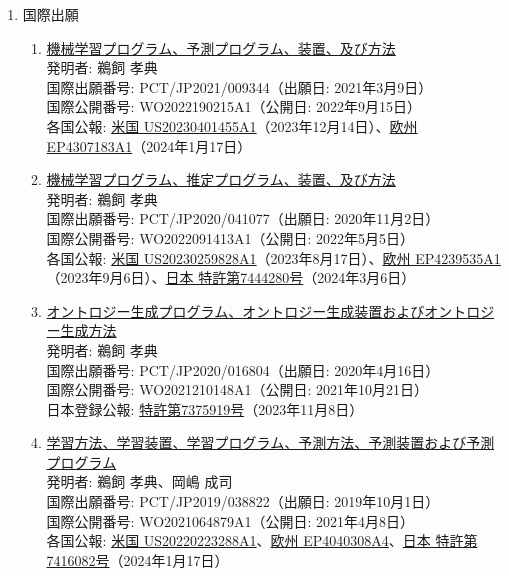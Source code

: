 \documentclass[dvipdfmx]{jlreq}
\begin{document}
\begin{enumerate}[label=\arabic*,align=parleft]
\item 国際出願
\begin{enumerate}
\item \href{https://patents.google.com/patent/WO2022190215A1/ja}{機械学習プログラム、予測プログラム、装置、及び方法}\\発明者: 鵜飼 孝典\\国際出願番号: PCT/JP2021/009344（出願日: 2021年3月9日）\\国際公開番号: WO2022190215A1（公開日: 2022年9月15日）\\各国公報: \href{https://patents.google.com/patent/US20230401455A1/en}{米国 US20230401455A1}（2023年12月14日）、\href{https://patents.google.com/patent/EP4307183A1/en}{欧州 EP4307183A1}（2024年1月17日）
\item \href{https://patents.google.com/patent/WO2022091413A1/ja}{機械学習プログラム、推定プログラム、装置、及び方法}\\発明者: 鵜飼 孝典\\国際出願番号: PCT/JP2020/041077（出願日: 2020年11月2日）\\国際公開番号: WO2022091413A1（公開日: 2022年5月5日）\\各国公報: \href{https://patents.google.com/patent/US20230259828A1/en}{米国 US20230259828A1}（2023年8月17日）、\href{https://patents.google.com/patent/EP4239535A1/en}{欧州 EP4239535A1}（2023年9月6日）、\href{https://patents.google.com/patent/JP7444280B2/ja}{日本 特許第7444280号}（2024年3月6日）
\item \href{https://patents.google.com/patent/WO2021210148A1/ja}{オントロジー生成プログラム、オントロジー生成装置およびオントロジー生成方法}\\発明者: 鵜飼 孝典\\国際出願番号: PCT/JP2020/016804（出願日: 2020年4月16日）\\国際公開番号: WO2021210148A1（公開日: 2021年10月21日）\\日本登録公報: \href{https://patents.google.com/patent/JP7375919B2/ja}{特許第7375919号}（2023年11月8日）
\item \href{https://patents.google.com/patent/WO2021064879A1/ja}{学習方法、学習装置、学習プログラム、予測方法、予測装置および予測プログラム}\\発明者: 鵜飼 孝典、岡嶋 成司\\国際出願番号: PCT/JP2019/038822（出願日: 2019年10月1日）\\国際公開番号: WO2021064879A1（公開日: 2021年4月8日）\\各国公報: \href{https://patents.google.com/patent/US20220223288A1/en}{米国 US20220223288A1}、\href{https://patents.google.com/patent/EP4040308A4/en}{欧州 EP4040308A4}、\href{https://patents.google.com/patent/JP7416082B2/ja}{日本 特許第7416082号}（2024年1月17日）

\end{enumerate}
\end{enumerate}
\end{document}
